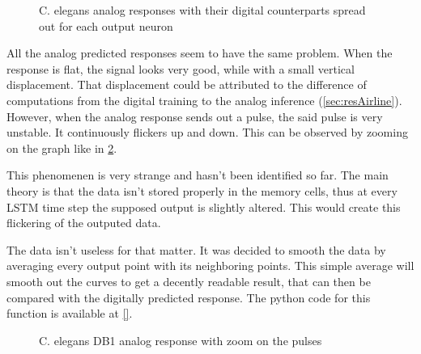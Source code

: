 \begin{figure}[H]
  \centering
  \begin{minipage}{\columnwidth}
    \hfill
  \end{minipage}
  \begin{minipage}{\columnwidth}
    \hfill
  \end{minipage}
  \caption{\ac{C. elegans} analog responses with their digital counterparts spread out for each output neuron}
  \label{graph:spread5Celegans}
\end{figure}

All the analog predicted responses seem to have the same problem. When the response is flat, the signal looks very good, while with a small vertical displacement. That displacement could be attributed to the difference of computations from the digital training to the analog inference (\cref{sec:resAirline}). However, when the analog response sends out a pulse, the said pulse is very unstable. It continuously flickers up and down. This can be observed by zooming on the graph like in \cref{graph:zoom5Celegans}.

This phenomenen is very strange and hasn't been identified so far. The main theory is that the data isn't stored properly in the memory cells, thus at every \ac{LSTM} time step the supposed output is slightly altered. This would create this flickering of the outputed data.

The data isn't useless for that matter. It was decided to smooth the data by averaging every output point with its neighboring points. This simple average will smooth out the curves to get a decently readable result, that can then be compared with the digitally predicted response. The python code for this function is available at \cref{}. %

\begin{figure}[H]
  \centering
  
  \caption{\acs{C. elegans} DB1 analog response with zoom on the pulses}
  \label{graph:zoom5Celegans}
\end{figure}

